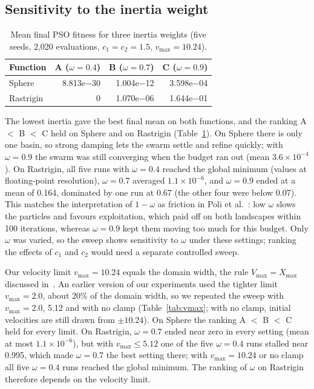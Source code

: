 \documentclass[11pt,a4paper]{article}
\newcommand{\vmax}{v_{\max}}
\begin{document}
\subsection{Sensitivity to the inertia weight}\label{sec:inertia}
\begin{table}[ht]
\centering
\caption{Mean final PSO fitness for three inertia weights (five seeds, 2,020 evaluations, $c_1=c_2=1.5$, $\vmax=10.24$).}\label{tab:omega}
\small
\begin{tabular}{@{}lrrr@{}}
\toprule
\textbf{Function} & \textbf{A ($\omega=0.4$)} & \textbf{B ($\omega=0.7$)} & \textbf{C ($\omega=0.9$)}\\
\midrule
Sphere & 8.813e$-$30 & 1.004e$-$12 & 3.598e$-$04\\
Rastrigin & 0 & 1.070e$-$06 & 1.644e$-$01\\
\bottomrule
\end{tabular}
\end{table}

The lowest inertia gave the best final mean on both functions, and the ranking A $<$ B $<$ C held on Sphere and on Rastrigin (Table~\ref{tab:omega}). On Sphere there is only one basin, so strong damping lets the swarm settle and refine quickly; with $\omega=0.9$ the swarm was still converging when the budget ran out (mean $3.6\times10^{-4}$). On Rastrigin, all five runs with $\omega=0.4$ reached the global minimum (values at floating-point resolution), $\omega=0.7$ averaged $1.1\times10^{-6}$, and $\omega=0.9$ ended at a mean of 0.164, dominated by one run at 0.67 (the other four were below 0.07). This matches the interpretation of $1-\omega$ as friction in Poli et al.~\cite{poli2007}: low $\omega$ slows the particles and favours exploitation, which paid off on both landscapes within 100 iterations, whereas $\omega=0.9$ kept them moving too much for this budget. Only $\omega$ was varied, so the sweep shows sensitivity to $\omega$ under these settings; ranking the effects of $c_1$ and $c_2$ would need a separate controlled sweep.

Our velocity limit $\vmax=10.24$ equals the domain width, the rule $V_{\max}=X_{\max}$ discussed in~\cite[Sects.~2.3--2.4]{poli2007}. An earlier version of our experiments used the tighter limit $\vmax=2.0$, about 20\% of the domain width, so we repeated the sweep with $\vmax=2.0$, 5.12 and with no clamp (Table~\ref{tab:vmax}; with no clamp, initial velocities are still drawn from $\pm10.24$). On Sphere the ranking A $<$ B $<$ C held for every limit. On Rastrigin, $\omega=0.7$ ended near zero in every setting (mean at most $1.1\times10^{-6}$), but with $\vmax\le5.12$ one of the five $\omega=0.4$ runs stalled near 0.995, which made $\omega=0.7$ the best setting there; with $\vmax=10.24$ or no clamp all five $\omega=0.4$ runs reached the global minimum. The ranking of $\omega$ on Rastrigin therefore depends on the velocity limit.
\end{document}
